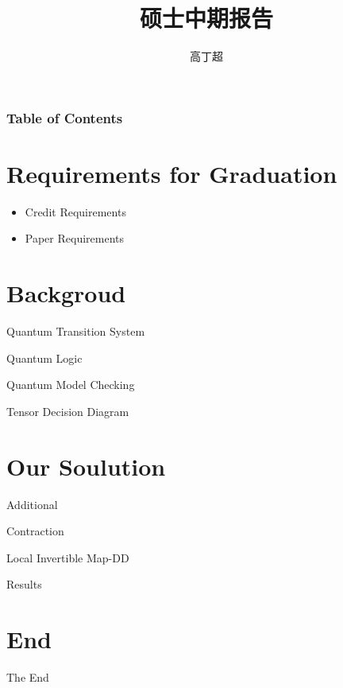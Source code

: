 \documentclass[aspectratio=1610]{beamer}
\title[Mid-term]{硕士中期报告}
\author[Gcc]{高丁超}
\institute[ISCAS]{Institute of Software Chinese Academy of Sciences}
\begin{document}
\begin{frame}[plain]
    \titlepage
\end{frame}

\begin{frame}
    \frametitle{Table of Contents}
    \tableofcontents
\end{frame}
\section{Requirements for Graduation}
\begin{frame}
    \begin{itemize}
        \item Credit Requirements
        \item Paper Requirements
    \end{itemize}
\end{frame}
\section{Backgroud}
\begin{frame}
\end{frame}
\begin{frame}{Quantum Transition System}
    
\end{frame}
\begin{frame}{Quantum Logic}
    
\end{frame}
\begin{frame}{Quantum Model Checking}
\end{frame}
\begin{frame}{Tensor Decision Diagram}
    
\end{frame}
\section{Our Soulution}
\begin{frame}{Additional}
    
\end{frame}
\begin{frame}{Contraction}
    
\end{frame}
\begin{frame}{Local Invertible Map-DD}
\end{frame}
\begin{frame}{Results}
    
\end{frame}
\section*{End}
\begin{frame}
    \centering
    \Huge The End
\end{frame}
\end{document}
